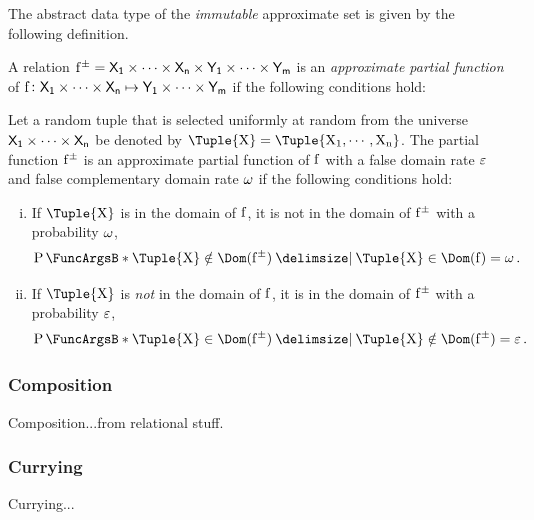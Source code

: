\documentclass[11pt,final,hidelinks]{article}
\begin{document}
The abstract data type of the \emph{immutable} approximate set is given by the following definition.
\begin{definition}
	\label{def:approx_pfun}
	A relation $\APFun{f} = \Set{X}[1] \times \cdots \times \Set{X}[n] \times \Set{Y}[1] \times \cdots \times \Set{Y}[m]$ is an \emph{approximate partial function} of $\PFun{f} \colon \Set{X}[1] \times \cdots \times \Set{X}[n] \mapsto \Set{Y}[1] \times \cdots \times \Set{Y}[m]$ if the following conditions hold:
	
	Let a random tuple that is selected uniformly at random from the universe $\Set{X}[1] \times \cdots \times \Set{X}[n]$ be denoted by $\Tuple{\RV{X}} = \Tuple{\RV{X_1},\cdots,\RV{X_n}}$. The partial function $\APFun{f}$ is an approximate partial function of $\PFun{f}$ with a false domain rate $\varepsilon$ and false complementary domain rate $\omega$ if the following conditions hold:
	\begin{enumerate}[(i)]
		\item If $\Tuple{\RV{X}}$ is in the domain of $\PFun{f}$, it is not in the domain of $\APFun{f}$ with a probability $\omega$,
		\begin{equation}
		\Prob{\Tuple{\RV{X}} \notin \Dom(\APFun{f}) \Given \Tuple{\RV{X}} \in \Dom(\PFun{f})} = \fnrate\,.
		\end{equation}    
		\item If $\Tuple{\RV{X}}$ is \emph{not} in the domain of $\PFun{f}$, it is in the domain of $\APFun{f}$ with a probability $\varepsilon$,
		\begin{equation}
		\Prob{\Tuple{\RV{X}} \in \Dom(\APFun{f}) \Given \Tuple{\RV{X}} \notin \Dom(\APFun{f})} = \fprate\,.
		\end{equation}
	\end{enumerate}
\end{definition}

\subsubsection{Composition}

Composition...from relational stuff.

\subsubsection{Currying}

Currying...

\providecommand{\mainx}{..}
\end{document}

